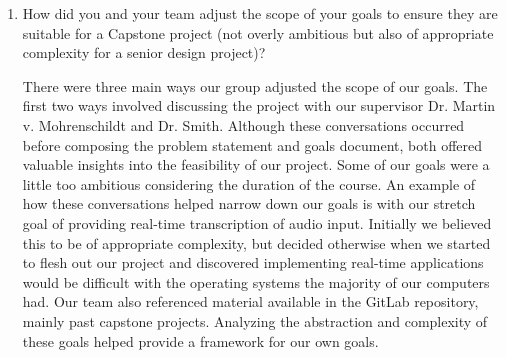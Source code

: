 \documentclass{article}
\begin{document}
\begin{enumerate}
    \item How did you and your team adjust the scope of your goals to ensure
    they are suitable for a Capstone project (not overly ambitious but also of
    appropriate complexity for a senior design project)?

    There were three main ways our group adjusted the scope of our goals. The first two ways involved discussing the project with our supervisor Dr. Martin v. Mohrenschildt and Dr. Smith. 
    Although these conversations occurred before composing the problem statement and goals document, both offered valuable insights into the feasibility of our project. Some of our goals were a little too ambitious considering the duration of the course. 
    An example of how these conversations helped narrow down our goals is with our stretch goal of providing real-time transcription of audio input. Initially we believed this to be of appropriate complexity, 
    but decided otherwise when we started to flesh out our project and discovered implementing real-time applications would be difficult with the operating systems the majority of our computers had. 
    Our team also referenced material available in the GitLab repository, mainly past capstone projects. Analyzing the abstraction and complexity of these goals helped provide a framework for our own goals.
\end{enumerate}  
\end{document}
